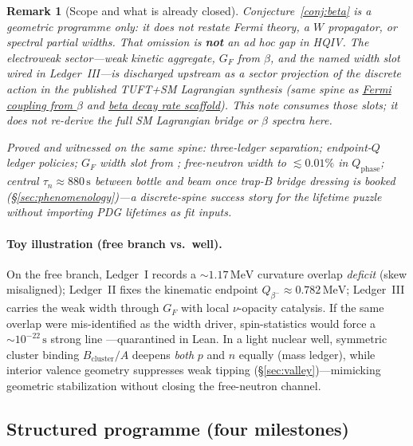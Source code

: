 \documentclass[11pt,notitlepage]{amsart}
\newtheorem{remark}[theorem]{Remark}
\begin{document}
\begin{remark}[Scope and what is already closed]
\label{rem:beta-conjecture-scope}
Conjecture~\ref{conj:beta} is a \emph{geometric} programme only: it does not restate
Fermi theory, a $W$ propagator, or spectral partial widths. That omission is
\textbf{not} an ad hoc gap in HQIV. The electroweak sector---weak kinetic aggregate,
$G_F$ from $\beta$, and the named width slot wired in Ledger~III---is discharged
upstream as a sector projection of the discrete action in the published TUFT+SM
Lagrangian synthesis \cite{hqiv-tuft-sm-lagrangian-paper} (same spine as
\hyperref[lean:gf-from-beta]{Fermi coupling from $\beta$} and
\hyperref[lean:beta-decay-rate]{beta decay rate scaffold}). This note \emph{consumes} those
slots; it does not re-derive the full SM Lagrangian bridge or $\beta$ spectra here.

Proved and witnessed on the same spine: three-ledger separation; endpoint-$Q$
ledger policies; $G_F$ width slot from \cite{hqiv-tuft-sm-lagrangian-paper};
free-neutron width to $\lesssim 0.01\%$ in $Q_{\mathrm{phase}}$; central
$\tau_n\approx 880\,\mathrm{s}$ between bottle and beam once trap-$B$ bridge dressing
is booked (\S\ref{sec:phenomenology})---a discrete-spine success story for the
lifetime puzzle without importing PDG lifetimes as fit inputs.
\end{remark}

\paragraph{Toy illustration (free branch vs.\ well).}
On the free branch, Ledger~I records a $\sim 1.17\,\mathrm{MeV}$ curvature overlap
\emph{deficit} (skew misaligned); Ledger~II fixes the kinematic endpoint
$Q_{\beta^-}\approx 0.782\,\mathrm{MeV}$; Ledger~III carries the weak width through
$G_F$ with local $\nu$-opacity catalysis. If the same overlap were mis-identified as
the width driver, spin-statistics would force a $\sim 10^{-22}\,\mathrm{s}$ strong line
---quarantined in Lean. In a light nuclear well, symmetric cluster binding
$B_{\mathrm{cluster}}/A$ deepens \emph{both} $p$ and $n$ equally (mass ledger), while
interior valence geometry suppresses weak tipping (\S\ref{sec:valley})---mimicking
geometric stabilization without closing the free-neutron channel.

\subsection{Structured programme (four milestones)}
\label{sec:beta-milestones}
\end{document}
